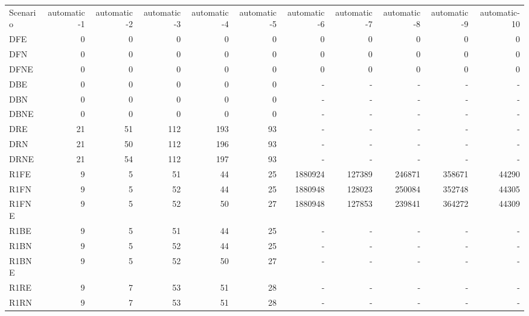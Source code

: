 \documentclass [11pt]{article}
\begin{document}
\begin{sidewaystable}
\small
  \everyrow{\hline}
  \begin{tabu} {| l |r | r |r |r |r |r |r |r |r |r |}
  Scenario    &automatic-1   & automatic-2    &automatic-3    &automatic-4    & automatic-5  & automatic-6    & automatic-7    &  automatic-8   & automatic-9   & automatic-10 \\
  DFE    & 0   & 0    & 0    & 0   &  0   &  0   & 0    & 0    &  0   & 0    \\ 
  DFN    & 0   & 0    & 0    & 0   &  0   &  0   & 0    & 0    &  0   & 0   \\ 
  DFNE   & 0   & 0    & 0    & 0   &  0   &   0   & 0    & 0    &  0   & 0    \\ 
  DBE    & 0   & 0    & 0    & 0   &  0   &  -   &   -    &   -    &    -   &   -   \\ 
  DBN    & 0   & 0    & 0    & 0   &  0   &  -   &   -    &   -    &    -   &   -   \\ 
  DBNE    & 0  & 0    & 0    & 0   &  0   &  -   &   -    &   -    &    -   &   -    \\ 
  DRE    & 21   & 51    & 112    & 193   &  93   &  -   &   -    &   -    &    -   &   -   \\ 
  DRN    & 21   & 50    & 112    & 196   &  93   &  -   &   -    &   -    &    -   &   -   \\ 
  DRNE   & 21   & 54    & 112    & 197   &  93   &  -   &   -    &   -    &    -   &   -    \\ 
  R1FE   & 9   & 5   & 51   & 44 &  25  &   1880924  & 127389   & 246871   &  358671  & 44290 \\ 
  R1FN    & 9  & 5   & 52   & 44 &  25  &   1880948  & 128023   & 250084   &  352748  & 44305   \\ 
  R1FNE    &9   &5    &52    &50  & 27   & 1880948   &127853    &239841    & 364272   &44309    \\ 
  R1BE    & 9  & 5   & 51   & 44 &  25  &  -   &   -    &   -    &    -   &   -    \\ 
  R1BN    & 9  & 5   & 52   & 44 &  25  &  -   &   -    &   -    &    -   &   -    \\ 
  R1BNE    &9   &5    &52    &50  & 27   &  -   &   -    &   -    &    -   &   -    \\ 
  R1RE    & 9  & 7   & 53   & 51 &  28  &  -   &   -    &   -    &    -   &   -    \\ 
  R1RN    & 9  & 7   & 53   & 51 &  28  &  -   &   -    &   -    &    -   &   -    \\ 

\end{tabu}
\end{sidewaystable}
\end{document}

